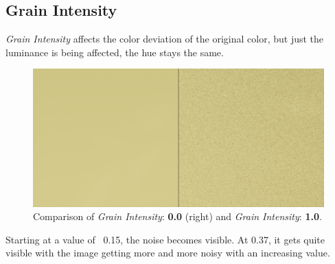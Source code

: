 \documentclass[A4]{article}
\begin{document}
	\subsection{Grain Intensity}
	\textit{Grain Intensity} affects the color deviation of the original color, but just the luminance is being affected, the hue stays the same.
	\begin{figure}
		\begin{center}
			\vspace{-20px}
			\includegraphics[scale=0.15]{GrainComparison.png}
			\vspace{-30px}
		\end{center}
		\caption{Comparison of \textit{Grain Intensity}: \textbf{0.0} (right) and \textit{Grain Intensity}: \textbf{1.0}.}
	\end{figure}
	Starting at a value of ~0.15, the noise becomes visible. At 0.37, it gets quite visible with the image getting more and more noisy with an increasing value.
	
\end{document}
